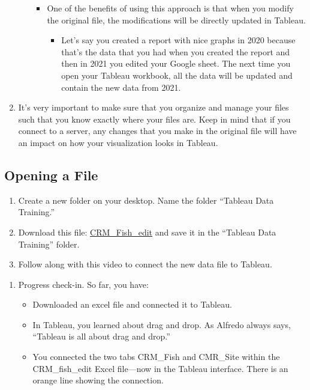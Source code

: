 \documentclass[
]{book}
\providecommand{\tightlist}{%
  \setlength{\itemsep}{0pt}\setlength{\parskip}{0pt}}
\begin{document}
\begin{enumerate}
\begin{itemize}
    \begin{itemize}
    \tightlist
    \item
      One of the benefits of using this approach is that when you modify the original file, the modifications will be directly updated in Tableau.

      \begin{itemize}
      \tightlist
      \item
        Let's say you created a report with nice graphs in 2020 because that's the data that you had when you created the report and then in 2021 you edited your Google sheet. The next time you open your Tableau workbook, all the data will be updated and contain the new data from 2021.
      \end{itemize}
    \end{itemize}
  \end{itemize}
\item
  It's very important to make sure that you organize and manage your files such that you know exactly where your files are. Keep in mind that if you connect to a server, any changes that you make in the original file will have an impact on how your visualization looks in Tableau.
\end{enumerate}

\hypertarget{opening-a-file}{%
\subsection{Opening a File}\label{opening-a-file}}

\begin{enumerate}
\def\labelenumi{\arabic{enumi}.}
\item
  Create a new folder on your desktop. Name the folder ``Tableau Data Training.''
\item
  Download this file: \href{files/CRM_Fish_edit.xlsx}{CRM\_Fish\_edit} and save it in the ``Tableau Data Training'' folder.
\item
  Follow along with this video to connect the new data file to Tableau.
\end{enumerate}

\begin{enumerate}
\def\labelenumi{\arabic{enumi}.}
\setcounter{enumi}{3}
\tightlist
\item
  Progress check-in. So far, you have:

  \begin{itemize}
  \tightlist
  \item
    Downloaded an excel file and connected it to Tableau.
  \item
    In Tableau, you learned about drag and drop. As Alfredo always says, ``Tableau is all about drag and drop.''
  \item
    You connected the two tabs CRM\_Fish and CMR\_Site within the CRM\_fish\_edit Excel file---now in the Tableau interface. There is an orange line showing the connection.
  \end{itemize}
\end{enumerate}
\end{document}
